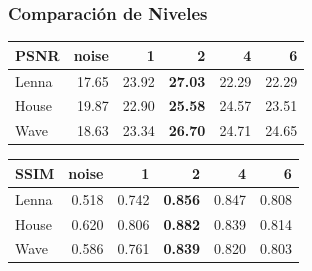 \documentclass{beamer}
\begin{document}
  \begin{frame}
    \frametitle{ Comparación de Niveles }
    \centering
    \begin{tabular}{lrrrrr}
      \toprule
      {PSNR} &  noise &      1 &      2 &      4 &      6 \\
      \midrule
      Lenna &  17.65 &  23.92 &  \bf{27.03} &  22.29 &  22.29 \\
      House &  19.87 &  22.90 &  \bf{25.58} &  24.57 &  23.51 \\
      Wave &  18.63 &  23.34 &  \bf{26.70} &  24.71 &  24.65 \\
      \bottomrule
      \end{tabular}
  
      \begin{tabular}{lrrrrr}
        {SSIM} &  noise &      1 &      2 &      4 &      6 \\
        \midrule
        Lenna &  0.518 &  0.742 &  \bf{0.856} &  0.847 &  0.808 \\
        House &  0.620 &  0.806 &  \bf{0.882} &  0.839 &  0.814 \\
        Wave &  0.586 &  0.761 &  \bf{0.839} &  0.820 &  0.803 \\
        \bottomrule
        \end{tabular}

  \end{frame}
\end{document}
